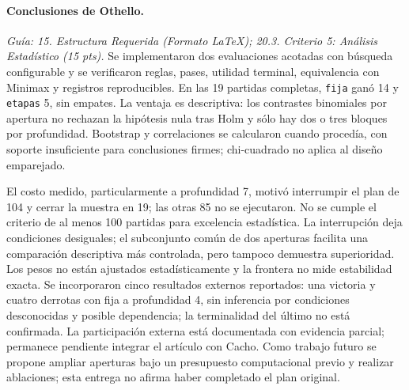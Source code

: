 \paragraph{Conclusiones de Othello.}
\textit{Guía: 15. Estructura Requerida (Formato \LaTeX); 20.3. Criterio 5: Análisis Estadístico (15 pts).}
Se implementaron dos evaluaciones acotadas con búsqueda configurable y se verificaron reglas, pases, utilidad terminal, equivalencia con Minimax y registros reproducibles. En las 19 partidas completas, \texttt{fija} ganó 14 y \texttt{etapas} 5, sin empates. La ventaja es descriptiva: los contrastes binomiales por apertura no rechazan la hipótesis nula tras Holm y sólo hay dos o tres bloques por profundidad. Bootstrap y correlaciones se calcularon cuando procedía, con soporte insuficiente para conclusiones firmes; chi-cuadrado no aplica al diseño emparejado.

El costo medido, particularmente a profundidad 7, motivó interrumpir el plan de 104 y cerrar la muestra en 19; las otras 85 no se ejecutaron. No se cumple el criterio de al menos 100 partidas para excelencia estadística. La interrupción deja condiciones desiguales; el subconjunto común de dos aperturas facilita una comparación descriptiva más controlada, pero tampoco demuestra superioridad. Los pesos no están ajustados estadísticamente y la frontera no mide estabilidad exacta. Se incorporaron cinco resultados externos reportados: una victoria y cuatro derrotas con fija a profundidad 4, sin inferencia por condiciones desconocidas y posible dependencia; la terminalidad del último no está confirmada. La participación externa está documentada con evidencia parcial; permanece pendiente integrar el artículo con Cacho. Como trabajo futuro se propone ampliar aperturas bajo un presupuesto computacional previo y realizar ablaciones; esta entrega no afirma haber completado el plan original.
